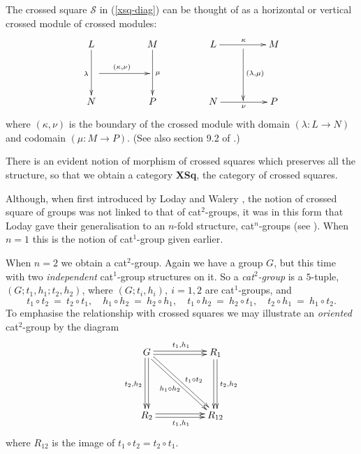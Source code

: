 \documentclass{ws-ijac}
\newcommand{\catXSq}    {{\bf XSq}}
\newcommand{\calS}{\mathcal{S}}
\begin{document}
The crossed square $\calS$ in (\ref{xsq-diag}) can be thought of 
as a horizontal or vertical crossed module of crossed modules:
\[
\xymatrix@R=20pt@C=20pt
{ L \ar[dd]_{\lambda}  
	&  &  M \ar[dd]^{\mu} 
	      &  &  L \ar[rr]^{\kappa}
	            &  {} \ar[dd]^{(\lambda,\mu)} 
	               &  M \\ 
\quad \ar[rr]^{(\kappa,\nu)} 
    &  &  &  &  &  & \quad \\
  N &  &  P 
	      &  &  N \ar[rr]_{\nu} 
	            &  {} 
	               &  P 
} 
\]
\noindent 
where $(\kappa,\nu)$ is the boundary of the crossed module with 
domain $(\lambda : L \rightarrow N)$ and codomain $(\mu : M \rightarrow P)$. 
(See also section 9.2 of \cite{wensley-notes}.)

There is an evident notion of morphism of crossed squares  
which preserves all the structure, 
so that we obtain a category \catXSq, the category of crossed squares.

\medskip
Although, when first introduced by Loday and Walery \cite{walery-loday}, 
the notion of crossed square of groups was not linked to that of cat$^{2}$-groups, 
it was in this form that Loday gave their generalisation 
to an $n$-fold structure, cat$^{n}$-groups (see \cite{Loday}). 
When $n=1$ this is the notion of cat$^1$-group given earlier.

When $n=2$ we obtain a cat$^{2}$-group. 
Again we have a group $G$, but this time with two \emph{independent} 
cat$^{1}$-group structures on it. 
So a \emph{cat$^{2}$-group} is a $5$-tuple, $(G;t_1,h_1;t_2,h_2)$, 
where $(G;t_{i},h_{i}),~ i=1,2$ are cat$^{1}$-groups, and
\[
t_{1} \circ t_{2} ~=~ t_{2} \circ t_{1}, \quad 
h_{1} \circ h_{2} ~=~ h_{2} \circ h_{1}, \quad 
t_{1} \circ h_{2} ~=~ h_{2} \circ t_{1}, \quad
t_{2} \circ h_{1} ~=~ h_{1} \circ t_{2}. 
\]
To emphasise the relationship with crossed squares 
we may illustrate an \emph{oriented} cat$^2$-group by the diagram 
\begin{equation} \label{cat2-diag}
\xymatrix@R=50pt@C=50pt 
{ G \ar@<+0.4ex>[r]^{t_1,h_1} \ar@<-0.4ex>[r] 
    \ar@<-0.4ex>[d]_{t_2,h_2} \ar@<+0.4ex>[d] 
    \ar@<-0.4ex>[rd]^{\ t_1 \circ t_2} \ar@<+0.4ex>[rd]_{h_1 \circ h_2} 
	& R_1 \ar@<+0.4ex>[d]^{t_2,h_2} \ar@<-0.4ex>[d] \\
  R_2 \ar@<-0.4ex>[r]_{t_1,h_1} \ar@<+0.4ex>[r] 
	& R_{12} 
}
\end{equation} 
where $R_{12}$ is the image of $t_1 \circ t_2 = t_2 \circ t_1$. 
\end{document}
